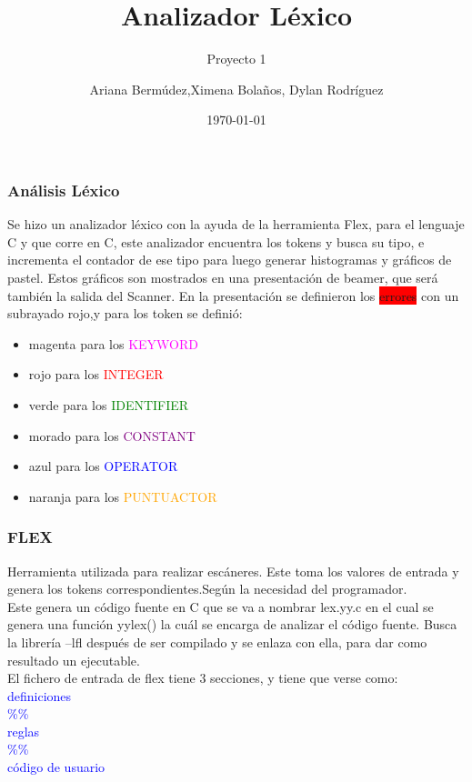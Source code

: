 \documentclass{beamer}
\title{Analizador L\'exico}
\subtitle{Proyecto 1}
\author{Ariana Berm\'udez,Ximena Bola\~nos, Dylan Rodr\'iguez}
\institute{Instituto Tecnol\'ogico de Costa Rica}
\date{\today}
\begin{document}
\begin{frame}
 \titlepage 
 \end{frame}\begin{frame}
 \frametitle{An\'alisis L\'exico}
 Se hizo un analizador l\'exico con la ayuda de la herramienta Flex, para el lenguaje C y que corre en C, este analizador encuentra los tokens y busca su tipo, e incrementa el contador de ese tipo para luego generar histogramas y gr\'aficos de pastel. Estos gr\'aficos son mostrados en una presentaci\'on de beamer, que ser\'a tambi\'en la salida del Scanner. En la presentaci\'on se definieron los \colorbox{red}{errores} con un subrayado rojo,y para los token se defini\'o:\begin{itemize} \item magenta para los \textcolor{magenta} {KEYWORD}  \item rojo para los \textcolor{red}{INTEGER} \item verde para los \textcolor{green} {IDENTIFIER} \item morado para los \textcolor{purple}{CONSTANT} \item azul para los \textcolor{blue} {OPERATOR} \item naranja para los \textcolor{orange} {PUNTUACTOR} \end{itemize} \end{frame}\begin{frame}
 \frametitle{FLEX}
 Herramienta utilizada para realizar esc\'aneres. Este toma los valores de entrada y genera los tokens correspondientes.Seg\'un la necesidad del programador. \\ Este genera un c\'odigo fuente en C que se va a nombrar lex.yy.c en el cual se genera una funci\'on yylex() la cu\'al se encarga de analizar el c\'odigo fuente. Busca la librer\'ia –lfl después de ser compilado y se enlaza con ella, para dar como resultado un ejecutable. \\ 
 El fichero de entrada de flex tiene 3 secciones, y tiene que verse como:\\ 
 \textcolor{blue}{definiciones \\ \%\% \\ reglas \\ \%\% \\ c\'odigo de usuario} \\ 
\end{frame}
\end{document}
